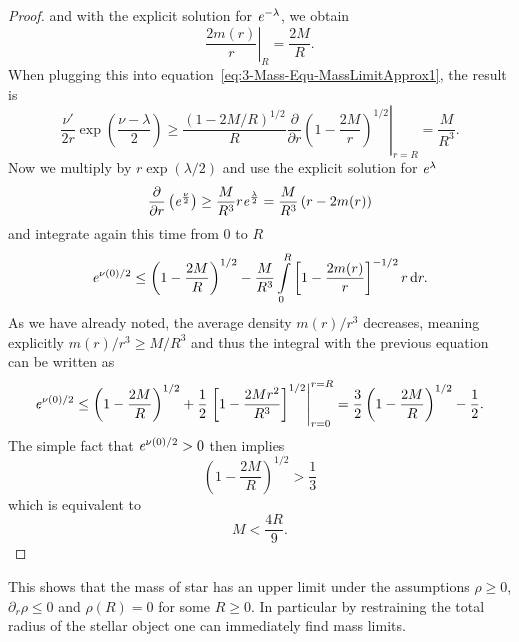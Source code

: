 \begin{proof}
	and with the explicit solution for $\mathit{e}^{-\lambda}$, we obtain
	\begin{equation}
		\left.\frac{2m(r)}{r}\right|_R = \frac{2M}{R}.
	\end{equation}
	When plugging this into equation~\eqref{eq:3-Mass-Equ-MassLimitApprox1}, the result is
	\begin{equation}
		\frac{\nu'}{2r}\exp\left(\frac{\nu-\lambda}{2}\right)\geq\frac{(1-2M/R)^{1/2}}{R}\left.\frac{\partial}{\partial r}\left(1-\frac{2M}{r}\right)^{1/2}\right|_{r=R} = \frac{M}{R^3}.
	\end{equation}
	Now we multiply by $r\exp(\lambda/2)$ and use the explicit solution for $\mathit{e}^\lambda$
	\begin{equation}
		\frac{\partial}{\partial r}\left(\mathit{e}^{\frac{\nu}{2}}\right) \geq \frac{M}{R^3}r\mathit{e}^\frac{\lambda}{2} = \frac{M}{R^3}\left(r-2m(r)\right)
	\end{equation}
	and integrate again this time from $0$ to $R$
	\begin{equation}
		\mathit{e}^{\nu(0)/2}\leq\left(1-\frac{2M}{R}\right)^{1/2}-\frac{M}{R^3}\int\limits_0^R\left[1-\frac{2m(r)}{r} \right]^{-1/2}r\mathop{}\!\mathrm{d} r.
		\label{eq:3-Mass-Equ-MassLimitNuApprox}
	\end{equation}
	As we have already noted, the average density $m(r)/r^3$ decreases, meaning explicitly $m(r)/r^3\geq M/R^3$ and thus the integral with the previous equation can be written as
	\begin{equation}
		\mathit{e}^{\nu(0)/2}\leq\left(1-\frac{2M}{R}\right)^{1/2}+\frac{1}{2}\left.\left[1-\frac{2Mr^2}{R^3} \right]^{1/2}\right|^{r=R}_{r=0} = \frac{3}{2}\left(1-\frac{2M}{R}\right)^{1/2} - \frac{1}{2}.
	\end{equation}
	The simple fact that $\mathit{e}^{\nu(0)/2}>0$ then implies
	\begin{equation}
		\left(1-\frac{2M}{R}\right)^{1/2} > \frac{1}{3}
	\end{equation}
	which is equivalent to
	\begin{equation}
		M< \frac{4R}{9}.
	\end{equation}
\end{proof}\noindent
This shows that the mass of star has an upper limit under the assumptions $\rho\geq0$, $\partial_r\rho\leq0$ and $\rho(R)=0$ for some $R\geq0$.
In particular by restraining the total radius of the stellar object one can immediately find mass limits.
